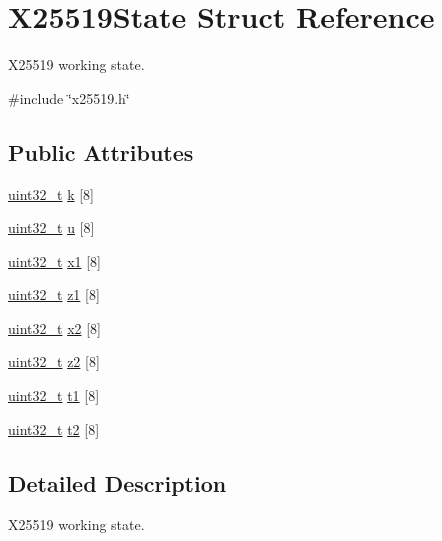 \hypertarget{structX25519State}{}\section{X25519\+State Struct Reference}
\label{structX25519State}


X25519 working state.  




{\ttfamily \#include \char`\"{}x25519.\+h\char`\"{}}

\subsection*{Public Attributes}
\begin{DoxyCompactItemize}
\item 
\hyperlink{stdint_8h_a435d1572bf3f880d55459d9805097f62}{uint32\+\_\+t} \hyperlink{structX25519State_aba67c25bd6f50ed73015a43499234369}{k} \mbox{[}8\mbox{]}
\item 
\hyperlink{stdint_8h_a435d1572bf3f880d55459d9805097f62}{uint32\+\_\+t} \hyperlink{structX25519State_a57460e5477241280d8156c7a239e9260}{u} \mbox{[}8\mbox{]}
\item 
\hyperlink{stdint_8h_a435d1572bf3f880d55459d9805097f62}{uint32\+\_\+t} \hyperlink{structX25519State_a6bb06918a64225ffdceddc7526b5f803}{x1} \mbox{[}8\mbox{]}
\item 
\hyperlink{stdint_8h_a435d1572bf3f880d55459d9805097f62}{uint32\+\_\+t} \hyperlink{structX25519State_ad87e44ce7d024bb758bf2f25cd889d17}{z1} \mbox{[}8\mbox{]}
\item 
\hyperlink{stdint_8h_a435d1572bf3f880d55459d9805097f62}{uint32\+\_\+t} \hyperlink{structX25519State_a5547627f368f078962c6d5fdfcccbad4}{x2} \mbox{[}8\mbox{]}
\item 
\hyperlink{stdint_8h_a435d1572bf3f880d55459d9805097f62}{uint32\+\_\+t} \hyperlink{structX25519State_afe45ed80227eb8e45144eef85169c5d5}{z2} \mbox{[}8\mbox{]}
\item 
\hyperlink{stdint_8h_a435d1572bf3f880d55459d9805097f62}{uint32\+\_\+t} \hyperlink{structX25519State_a02524016180bcfe425ca75b597b75143}{t1} \mbox{[}8\mbox{]}
\item 
\hyperlink{stdint_8h_a435d1572bf3f880d55459d9805097f62}{uint32\+\_\+t} \hyperlink{structX25519State_a8652003f2315c681c8dd1ddd424a94c3}{t2} \mbox{[}8\mbox{]}
\end{DoxyCompactItemize}


\subsection{Detailed Description}
X25519 working state. 

